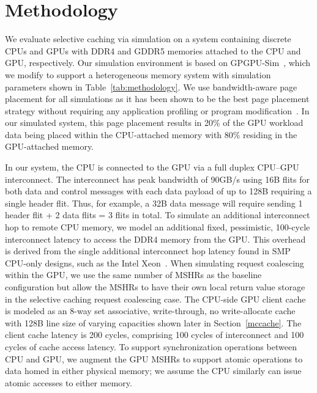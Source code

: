 \section{Methodology}
\label{methodology}

We evaluate selective caching via simulation on a system containing discrete CPUs and GPUs with
DDR4 and GDDR5 memories attached to the CPU and GPU, respectively.  Our simulation environment is based on
GPGPU-Sim~\cite{gpgpusim_ispass09}, which we modify to support a heterogeneous
memory system with simulation parameters shown in Table~\ref{tab:methodology}.
We use bandwidth-aware page placement for all simulations as it has been
shown to be the best page placement strategy without requiring
any application profiling or program modification~\cite{Agarwal2015}. 
In our simulated system, this page placement results in 20\% of the
GPU workload data being placed within the CPU-attached memory with 80\% residing in the GPU-attached
memory.  

In our system, the CPU is connected to the GPU via a full duplex CPU--GPU
interconnect. The interconnect has peak bandwidth of 90GB/s using
16B flits for both data and control messages with each data payload of up to
128B requiring a single header flit.  Thus, for example, a 32B data
message will require sending 1 header flit + 2 data flits = 3 flits in total.
To simulate an additional interconnect hop to remote CPU memory, we model an
additional fixed, pessimistic, 100-cycle interconnect latency to access the DDR4 memory from
the GPU\@. This overhead is derived from the single additional interconnect hop
latency found in SMP CPU-only designs, such as the Intel Xeon~\cite{INTELXEONE5V3}.
When simulating request coalescing within the GPU, we use the same number of MSHRs as
the baseline configuration but allow the MSHRs to have their own local return value storage in
the selective caching request coalescing case. 
The CPU-side GPU client cache is modeled as an 8-way set 
associative, write-through, no write-allocate cache with 128B line size of varying capacities
shown later in Section~\ref{mccache}. The client cache latency is 200
cycles, comprising 100 cycles of interconnect and 100 cycles of cache access latency.
To support synchronization operations between CPU and GPU, we augment the GPU 
MSHRs to support atomic operations to data homed in either physical memory; we assume
the CPU similarly can issue atomic accesses to either memory.

